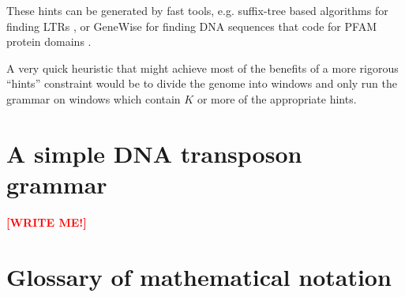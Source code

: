 \documentclass[10pt]{article}
\newcommand{\seclabel}[1]{\label{sec:#1}}
\newcommand\redpen[1]{{\bf \textcolor{red}{#1}} \textcolor{black}{}}
\newcommand\writeme{\redpen{\bf [WRITE ME!]}}
\begin{document}
These hints can be generated by fast tools, e.g. suffix-tree based algorithms for finding LTRs \cite{pmid16819780},
or GeneWise for finding DNA sequences that code for PFAM protein domains \cite{BirneyEtAl04}.

A very quick heuristic that might achieve most of the benefits of a more rigorous ``hints'' constraint
would be to divide the genome into windows and only run the grammar on windows which contain $K$ or more of the appropriate hints.

\section{A simple DNA transposon grammar}
\seclabel{TransposonGrammar}

\writeme

\section{Glossary of mathematical notation}
\end{document}
